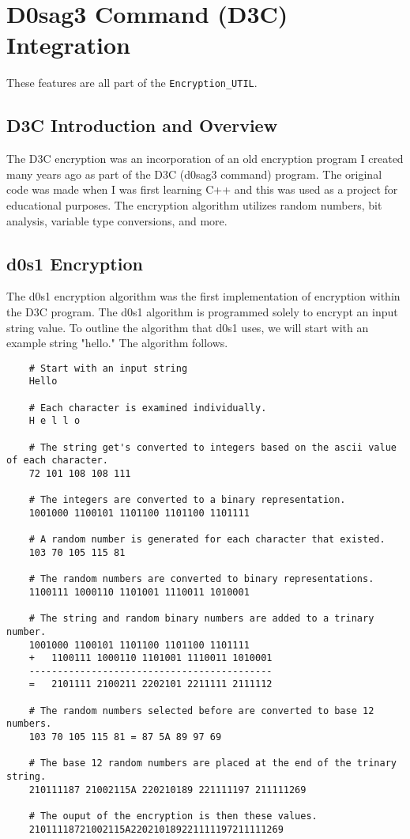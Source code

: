 \section{D0sag3 Command (D3C) Integration} \label{D3C}

These features are all part of the \texttt{Encryption\_UTIL}.

\subsection{D3C Introduction and Overview}

The D3C encryption was an incorporation of an old encryption program I created many years ago as part of the D3C (d0sag3 command) program. The original code was made when I was first learning C++ and this was used as a project for educational purposes. The encryption algorithm utilizes random numbers, bit analysis, variable type conversions, and more. 

\subsection{d0s1 Encryption}

The d0s1 encryption algorithm was the first implementation of encryption within the D3C program. The d0s1 algorithm is programmed solely to encrypt an input string value. To outline the algorithm that d0s1 uses, we will start with an example string "hello." The algorithm follows.

\begin{lstlisting}
	# Start with an input string
	Hello
	
	# Each character is examined individually.
	H e l l o
	
	# The string get's converted to integers based on the ascii value of each character.
	72 101 108 108 111
	
	# The integers are converted to a binary representation.
	1001000 1100101 1101100 1101100 1101111
	
	# A random number is generated for each character that existed.
	103 70 105 115 81
	
	# The random numbers are converted to binary representations.
	1100111 1000110 1101001 1110011 1010001
	
	# The string and random binary numbers are added to a trinary number.
	1001000 1100101 1101100 1101100 1101111
	+	1100111 1000110 1101001 1110011 1010001
	-------------------------------------------
	=	2101111 2100211 2202101 2211111 2111112
	
	# The random numbers selected before are converted to base 12 numbers.
	103 70 105 115 81 = 87 5A 89 97 69
	
	# The base 12 random numbers are placed at the end of the trinary string.
	210111187 21002115A 220210189 221111197 211111269
	
	# The ouput of the encryption is then these values.
	21011118721002115A220210189221111197211111269
\end{lstlisting}

